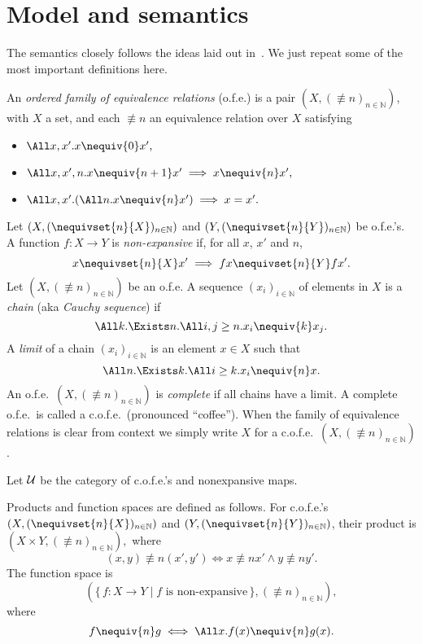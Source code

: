 \section{Model and semantics}


The semantics closely follows the ideas laid out in~\cite{catlogic}.
We just repeat some of the most important definitions here.

An \emph{ordered family of equivalence relations} (o.f.e.\@) is a pair
$(X,(\nequiv{n})_{n\in\mathbb{N}})$, with $X$ a set, and each $\nequiv{n}$ 
an equivalence relation over $X$ satisfying
\begin{itemize}
	\item $\All x,x'. x \nequiv{0} x',$
	\item $\All x,x',n. x \nequiv{n+1} x' \implies x \nequiv{n} x',$
	\item $\All x,x'. (\All n. x\nequiv{n} x') \implies x = x'.$
\end{itemize}
\a
Let $(X,(\nequivset{n}{X})_{n\in\mathbb{N}})$ and
$(Y,(\nequivset{n}{Y})_{n\in\mathbb{N}})$ be o.f.e.'s. A function $f:
X\to Y$ is \emph{non-expansive} if,   for all $x$, $x'$ and $n$,
\[
x \nequivset{n}{X} x' \implies 
fx \nequivset{n}{Y} f x'.
\]
Let $(X,(\nequiv{n})_{n\in\mathbb{N}})$ be an o.f.e.
A sequence $(x_i)_{i\in\mathbb{N}}$ of elements in $X$ is a
\emph{chain} (aka \emph{Cauchy sequence}) if
\[
\All k. \Exists n. \All i,j\geq n. x_i \nequiv{k} x_j.
\]
A \emph{limit} of a chain $(x_i)_{i\in\mathbb{N}}$ is an element
$x\in X$ such that
\[
\All n. \Exists k. \All i\geq k. x_i \nequiv{n} x.
\]
An o.f.e.\ $(X,(\nequiv{n})_{n\in\mathbb{N}})$ is \emph{complete} 
if all chains have a limit.
A complete o.f.e.\ is called a c.o.f.e.\ (pronounced ``coffee'').
When the family of equivalence relations is clear from context we
simply
write $X$ for a c.o.f.e.\ $(X,(\nequiv{n})_{n\in\mathbb{N}})$.


Let $\cal U$ be the category of c.o.f.e.'s and nonexpansive maps.

Products and function spaces are defined as follows.
For c.o.f.e.'s $(X,(\nequivset{n}{X})_{n\in\mathbb{N}})$ and
$(Y,(\nequivset{n}{Y})_{n\in\mathbb{N}})$, their product 
is 
$(X\times Y, (\nequiv{n})_{n\in\mathbb{N}}),$
where
\[
(x,y) \nequiv{n} (x',y') \iff
x \nequiv{n} x' \land
y \nequiv{n} y'.
\]
The function space is
\[
(\{\, f : X\to Y \mid f \text{ is non-expansive}\,\}, (\nequiv{n})_{n\in\mathbb{N}}),
\]
where
\[
f \nequiv{n} g \iff
\All x. f(x)  \nequiv{n}  g(x).
\]

